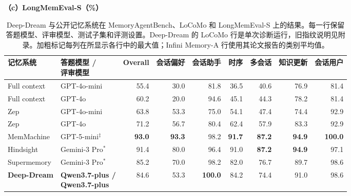 \begin{table}[t]
\vspace{3pt}
{\footnotesize\textbf{（c）LongMemEval-S（\%）}}\\[1.5pt]
{\tiny\setlength{\tabcolsep}{0pt}\begin{tabular*}{\textwidth}{@{\extracolsep{\fill}}>{\raggedright\arraybackslash}p{}>{\raggedright\arraybackslash}p{}rrrrrrr@{}}
\toprule
记忆系统 & \shortstack[l]{答题模型 /\\ 评审模型} & Overall & 会话偏好 & 会话助手 & 时序 & 多会话 & 知识更新 & 会话用户 \\
\midrule
Full context & GPT-4o-mini & 55.4 & 30.0 & 81.8 & 36.5 & 40.6 & 76.9 & 81.4 \\
Full context & GPT-4o & 60.2 & 20.0 & 94.6 & 45.1 & 44.3 & 78.2 & 81.4 \\
\midrule
Zep & GPT-4o-mini & 63.8 & 53.3 & 75.0 & 54.1 & 47.4 & 74.4 & 92.9 \\
Zep & GPT-4o & 71.2 & 56.7 & 80.4 & 62.4 & 57.9 & 83.3 & 92.9 \\
\rowcolor{green!9}
MemMachine & GPT-5-mini$^\ddagger$ & \textbf{93.0} & \textbf{93.3} & 98.2 & \textbf{91.7} & \textbf{87.2} & \textbf{94.9} & \textbf{100.0} \\
\rowcolor{green!9}
Hindsight & Gemini-3 Pro$^\ast$ & 91.4 & 80.0 & 96.4 & 91.0 & \textbf{87.2} & \textbf{94.9} & 97.1 \\
\rowcolor{green!9}
Supermemory & Gemini-3 Pro$^\ast$ & 85.2 & 70.0 & 98.2 & 82.0 & 76.7 & 89.7 & 98.6 \\
\midrule
\rowcolor{blue!9}
\textbf{Deep-Dream} & \shortstack[l]{\textbf{Qwen3.7-plus /}\\\textbf{Qwen3.7-plus}} & 84.6 & 53.3 & \textbf{100.0} & 84.2 & 74.4 & 91.0 & 98.6 \\
\bottomrule
\end{tabular*}}
\caption{Deep-Dream 与公开记忆系统在 MemoryAgentBench、LoCoMo 和 LongMemEval-S 上的结果。每一行保留答题模型、评审模型、测试子集和评测设置。Deep-Dream 的 LoCoMo 行是单次诊断运行，旧指纹说明见附录。加粗标记每列在所显示各行中的最大值；Infini Memory-A 行使用其论文报告的类别平均值。}
\label{tab:main-cross-system}
\end{table}

